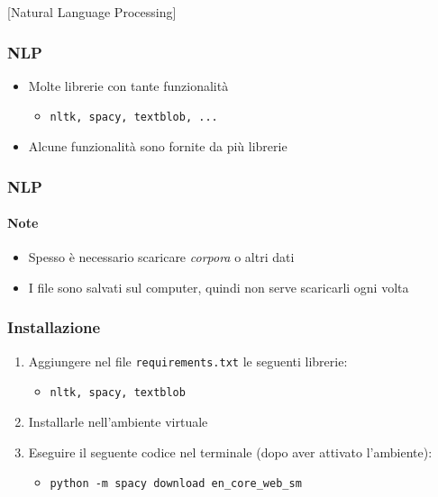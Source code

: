 [Natural Language Processing]

\begin{contentframe}
    \frametitle{NLP}

    \begin{itemize}
        \item Molte librerie con tante funzionalità
        \begin{itemize}
            \item \texttt{nltk, spacy, textblob, ...}
        \end{itemize}

        \bigskip
        \item Alcune funzionalità sono fornite da più librerie
    \end{itemize}
\end{contentframe}

\begin{exampleframe}
    \frametitle{NLP}
    \framesubtitle{Note}

    \begin{itemize}
        \item Spesso è necessario scaricare \textit{corpora} o altri dati
        \item I file sono salvati sul computer, quindi non serve scaricarli ogni volta
    \end{itemize}
\end{exampleframe}

\begin{exerciseframe}
    \frametitle{Installazione}

    \begin{enumerate}
        \item Aggiungere nel file \texttt{requirements.txt} le seguenti librerie:
        \begin{itemize}
            \item \texttt{nltk, spacy, textblob}
        \end{itemize}
        \item Installarle nell'ambiente virtuale
        \item Eseguire il seguente codice nel terminale (dopo aver attivato l'ambiente):
        \begin{itemize}
            \item \texttt{python -m spacy download en\_core\_web\_sm}
        \end{itemize}
    \end{enumerate}
\end{exerciseframe}

